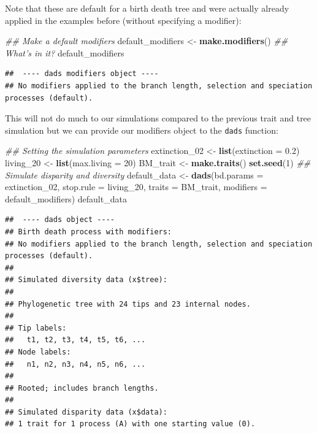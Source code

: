 \documentclass[]{book}
\newenvironment{Shaded}{\begin{snugshade}}{\end{snugshade}}
\newcommand{\CommentTok}[1]{\textcolor[rgb]{0.56,0.35,0.01}{\textit{#1}}}
\newcommand{\DataTypeTok}[1]{\textcolor[rgb]{0.13,0.29,0.53}{#1}}
\newcommand{\DecValTok}[1]{\textcolor[rgb]{0.00,0.00,0.81}{#1}}
\newcommand{\FloatTok}[1]{\textcolor[rgb]{0.00,0.00,0.81}{#1}}
\newcommand{\KeywordTok}[1]{\textcolor[rgb]{0.13,0.29,0.53}{\textbf{#1}}}
\newcommand{\NormalTok}[1]{#1}
\newcommand{\StringTok}[1]{\textcolor[rgb]{0.31,0.60,0.02}{#1}}
\begin{document}
Note that these are default for a birth death tree and were actually already applied in the examples before (without specifying a modifier):

\begin{Shaded}
\begin{Highlighting}[]
\CommentTok{## Make a default modifiers}
\NormalTok{default_modifiers <-}\StringTok{ }\KeywordTok{make.modifiers}\NormalTok{()}
\CommentTok{## What's in it?}
\NormalTok{default_modifiers}
\end{Highlighting}
\end{Shaded}

\begin{verbatim}
##  ---- dads modifiers object ---- 
## No modifiers applied to the branch length, selection and speciation processes (default).
\end{verbatim}

This will not do much to our simulations compared to the previous trait and tree simulation but we can provide our modifiers object to the \texttt{dads} function:

\begin{Shaded}
\begin{Highlighting}[]
\CommentTok{## Setting the simulation parameters}
\NormalTok{extinction_}\DecValTok{02}\NormalTok{ <-}\StringTok{ }\KeywordTok{list}\NormalTok{(}\DataTypeTok{extinction =} \FloatTok{0.2}\NormalTok{)}
\NormalTok{living_}\DecValTok{20}\NormalTok{     <-}\StringTok{ }\KeywordTok{list}\NormalTok{(}\DataTypeTok{max.living =} \DecValTok{20}\NormalTok{)}
\NormalTok{BM_trait      <-}\StringTok{ }\KeywordTok{make.traits}\NormalTok{()}
\KeywordTok{set.seed}\NormalTok{(}\DecValTok{1}\NormalTok{)}
\CommentTok{## Simulate disparity and diversity}
\NormalTok{default_data <-}\StringTok{ }\KeywordTok{dads}\NormalTok{(}\DataTypeTok{bd.params =}\NormalTok{ extinction_}\DecValTok{02}\NormalTok{,}
                     \DataTypeTok{stop.rule =}\NormalTok{ living_}\DecValTok{20}\NormalTok{,}
                     \DataTypeTok{traits    =}\NormalTok{ BM_trait,}
                     \DataTypeTok{modifiers =}\NormalTok{ default_modifiers)}
\NormalTok{default_data}
\end{Highlighting}
\end{Shaded}

\begin{verbatim}
##  ---- dads object ---- 
## Birth death process with modifiers:
## No modifiers applied to the branch length, selection and speciation processes (default).
## 
## Simulated diversity data (x$tree):
## 
## Phylogenetic tree with 24 tips and 23 internal nodes.
## 
## Tip labels:
##   t1, t2, t3, t4, t5, t6, ...
## Node labels:
##   n1, n2, n3, n4, n5, n6, ...
## 
## Rooted; includes branch lengths.
## 
## Simulated disparity data (x$data):
## 1 trait for 1 process (A) with one starting value (0).
\end{verbatim}
\end{document}
